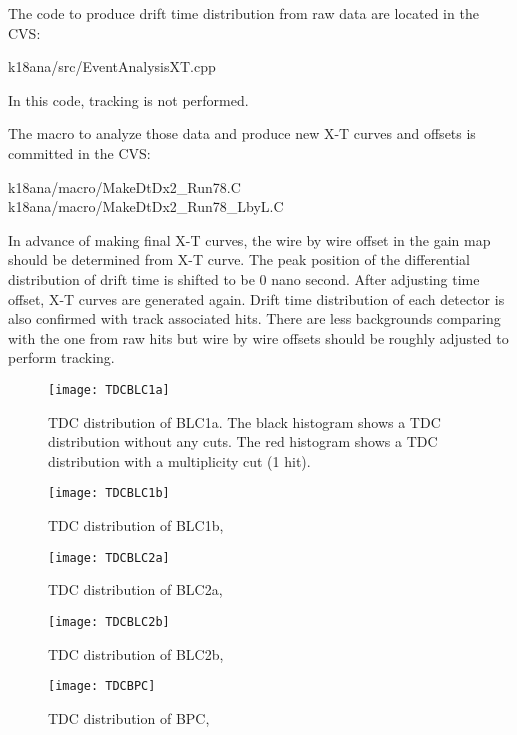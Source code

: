 The code to produce drift time distribution from raw data are located in the CVS:
\begin{screen}
k18ana/src/EventAnalysisXT.cpp 
\end{screen}
In this code, tracking is not performed.


The macro to analyze those data and produce new X-T curves and offsets is committed in the CVS:
\begin{screen}
k18ana/macro/MakeDtDx2\_Run78.C \\
k18ana/macro/MakeDtDx2\_Run78\_LbyL.C 
\end{screen}


In advance of making final X-T curves, the wire by wire offset in the gain map should be determined from X-T curve. 
The peak position of the differential distribution of drift time is shifted to be 0 nano second. After adjusting time offset, X-T curves are generated again.  
Drift time distribution of each detector is also confirmed with track associated hits. There are less backgrounds comparing with the one from raw hits but wire by wire offsets should be roughly adjusted to perform tracking.
 

\begin{figure}
\texttt{[image: TDCBLC1a]}
\caption{TDC distribution of BLC1a. The black histogram shows a TDC distribution without any cuts. The red histogram shows a TDC distribution with a multiplicity cut (1 hit). }
\label{fig:TDCBLC1a}
\end{figure}

\begin{figure}
\texttt{[image: TDCBLC1b]}
\caption{TDC distribution of BLC1b, }
\label{fig:TDCBLC1b}
\end{figure}

\begin{figure}
\texttt{[image: TDCBLC2a]}
\caption{TDC distribution of BLC2a, }
\label{fig:TDCBLC2a}
\end{figure}

\begin{figure}
\texttt{[image: TDCBLC2b]}
\caption{TDC distribution of BLC2b, }
\label{fig:TDCBLC2b}
\end{figure}

\begin{figure}
\texttt{[image: TDCBPC]}
\caption{TDC distribution of BPC, }
\label{fig:TDCBPC}
\end{figure}

